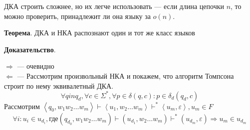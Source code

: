 \documentclass[a4paper, 14pt]{extarticle}
\begin{document}
ДКА строить сложнее, но их легче использовать --- если длина цепочки $n$, то можно проверить, принадлежит ли она языку за $o(n)$.

\begin{tcolorbox}
    \textbf{Теорема}. ДКА и НКА распознают один и тот же класс языков 
\end{tcolorbox}

\begin{tcolorbox}
    \textbf{Доказательство}.

    $\Rightarrow$ --- очевидно\\
    $ \Leftarrow $ --- Рассмотрим произвольный НКА и покажем, что алгоритм Томпсона строит по нему эквивалетный ДКА.
    \[ \forall q in q_d, \forall c \in \Sigma^*, \forall p \in \delta(q, c): p \in \delta_d(q_d, c) \]
    Рассмотрим $ \left\langle q_0, w_1 w_2 \ldots w_m \right\rangle \vdash \left\langle u_1, w_2 \ldots w_m \right\rangle \vdash^* \left\langle u_m, \varepsilon \right\rangle, u_m \in F $
    \[ \forall i: u_i \in u_{d_i}, \text{где} (q_{d_0}, w_1 w_2 \ldots w_m) \vdash (u_{d_1}, w_2 \ldots w_m) \vdash^*(u_{d_m}, \varepsilon) \Rightarrow u_m \in u_{d_m} \] 
\end{tcolorbox}
\end{document}
